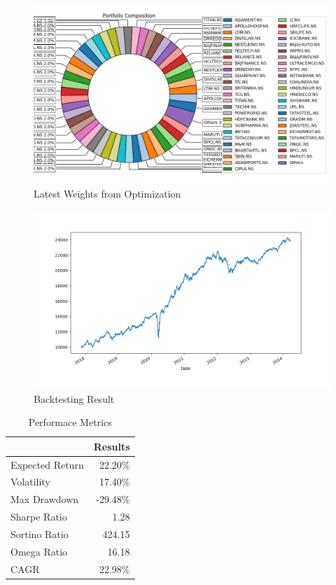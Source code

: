 \begin{figure}[H]
   \centering
   \includegraphics[width=1\linewidth]{images/RF/Weights.png}
   \caption{Latest Weights from Optimization}
   \label{fig:network_architecture1}
 \end{figure}

 \begin{figure}[H]
   \centering
   \includegraphics[width=1\linewidth]{images/Max_diver/backtest.png}
   \caption{Backtesting Result}
   \label{fig:network_architecture1}
 \end{figure}

 \begin{table}[H]

    \centering %
    \label{tab:performance_metrics}
    
    \caption{Performace Metrics}
    \vspace{5mm} %

\begin{tabular}{lr}
\toprule
 & Results \\
\midrule
Expected Return & 22.20\% \\
Volatility & 17.40\% \\
Max Drawdown & -29.48\% \\
Sharpe Ratio & 1.28 \\
Sortino Ratio & 424.15 \\
Omega Ratio & 16.18 \\
CAGR & 22.98\% \\
\bottomrule
\end{tabular}
\end{table}

